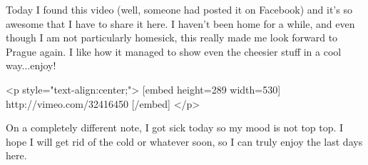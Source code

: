 \begin{post}
	\begin{content}
Today I found this video (well, someone had posted it on Facebook) and it's so awesome that I have to share it here. I haven't been home for a while, and even though I am not particularly homesick, this really made me look forward to Prague again. I like how it managed to show even the cheesier stuff in a cool way...enjoy!

<p style="text-align:center;">
[embed height=289 width=530]
http://vimeo.com/32416450
[/embed]
</p>

On a completely different note, I got sick today so my mood is not top top. I hope I will get rid of the cold or whatever soon, so I can truly enjoy the last days here.
	\end{content}
\end{post}
